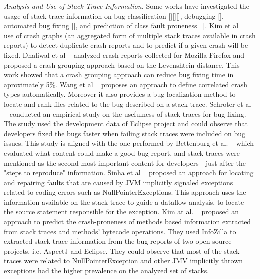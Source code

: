 \documentclass[conference]{IEEEtran}
\begin{document}
\textit{Analysis and Use of Stack Trace Information.} Some works have investigated the usage of stack trace information on bug classification [][][], debugging [], automated bug fixing [], and prediction of class fault proneness[][]. Kim et al ~\cite{kim2011crash} use of crash graphs (an aggregated form of multiple stack traces available in crash reports) to detect duplicate crash reports and to predict if a given crash will be fixed. Dhaliwal et al ~\cite{} analyzed crash reports collected for Mozilla Firefox and proposed a crash grouping approach based on the Levenshtein distance. This work showed that a crash grouping approach can reduce bug fixing time in aproximately 5\%. Wang et al ~\cite{} proposes an approach to define correlated crash types automatically. Moreover it also provides a bug localization method to locate and rank files related to the bug described on a stack trace.
Schroter et al ~\cite{schroter2010stack} conducted an empirical study on the usefulness of stack traces for bug fixing. The study used the development data of Eclipse project and could observe that developers fixed the bugs faster when failing stack traces were included on bug issues. This study is aligned with the one performed by Bettenburg et al.  ~\cite{bettenburg2008makes} which evaluated what content could make a good bug report, and stack traces were mentioned as the second most important content for developers - just after the "steps to reproduce" information. Sinha et al ~\cite{sinha2009fault} proposed an approach for locating and repairing faults that are caused by JVM implicitly signaled exceptions related to coding errors such as NullPointerExceptions. This approach uses the information available on the stack trace to guide a dataflow analysis, to locate the source statement responsible for the exception. Kim at al. ~\cite{kim2013predicting} proposed an approach to predict the crash-proneness of methods based information extracted from stack traces and methods' bytecode operations. They used InfoZilla to extracted stack trace information from the bug reports of two open-source projects, i.e. AspectJ and Eclipse. They could observe that most of the stack traces were related to NullPointerException and other JMV implicitly thrown exceptions had the higher prevalence on the analyzed set of stacks.
 
\end{document}
